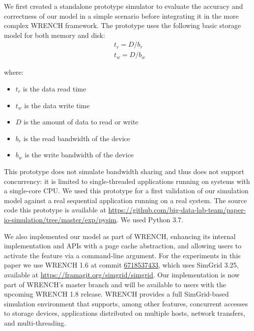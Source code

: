 \documentclass[conference]{IEEEtran}
\newcommand{\simgrid}{SimGrid\xspace}
\newcommand{\wrench}{WRENCH\xspace}
\begin{document}
            We first created a standalone prototype
            simulator to evaluate the accuracy and correctness of our
            model in a simple scenario before integrating it in the more complex
            \wrench framework.
            The prototype uses the following basic storage model for
            both memory and disk:
            \begin{align*}
                & t_{r} = D / b_r \\
                & t_{w} = D / b_w\
            \end{align*}

            where:
            \begin{itemize}
                \item $t_{r}$ is the data read time
                \item $t_{w}$ is the data write time
                \item $D$ is the amount of data to read or write
                \item $b_r$ is the read bandwidth of the device
                \item $b_w$ is the write bandwidth of the device
            \end{itemize}

            This prototype does not simulate  bandwidth sharing and thus does not support
            concurrency: it is limited to single-threaded applications running on systems
            with a single-core CPU. We used this prototype for a first validation of our simulation
            model against a real sequential application running on a real system.
            The source code this prototype is available at
            \url{https://github.com/big-data-lab-team/paper-io-simulation/tree/master/exp/pysim}. We used Python 3.7.

            We also implemented our model as part of \wrench, enhancing its
            internal implementation and APIs with a page cache abstraction,
            and allowing users to activate the feature via a command-line
            argument. For the experiments in this paper we use \wrench 1.6
            at commit
            \href{https://github.com/wrench-project/wrench/tree/67185374330d2c4bf274fce222c937e838df5b03}{6718537433},
            which uses \simgrid 3.25, available at
            \url{https://framagit.org/simgrid/simgrid}. Our implementation
            is now part of \wrench's master branch and will be available to
            users with the upcoming \wrench 1.8 release. \wrench provides a full \simgrid-based simulation 
            environment that supports, among other features, concurrent accesses to storage devices, 
            applications distributed on multiple hosts, network transfers, 
            and multi-threading. 
\end{document}

